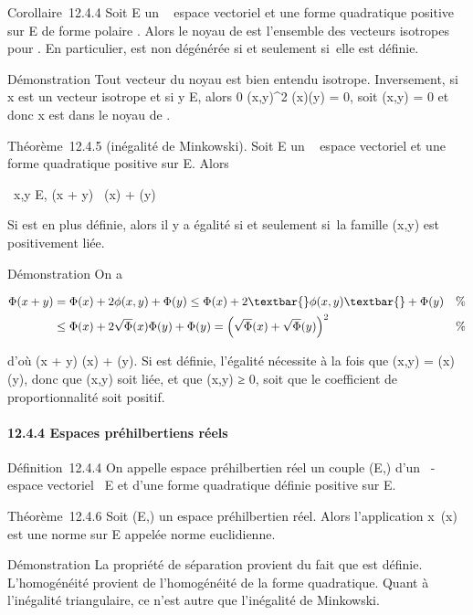 \documentclass[]{article}
\begin{document}
Corollaire~12.4.4 Soit E un ~ espace vectoriel et \Phi une forme
quadratique positive sur E de forme polaire \phi. Alors le noyau de \Phi est
l'ensemble des vecteurs isotropes pour \Phi. En particulier, \Phi est non
dégénérée si et seulement si~elle est définie.

Démonstration Tout vecteur du noyau est bien entendu isotrope.
Inversement, si x est un vecteur isotrope et si y \in E, alors 0 \leq
\phi(x,y)^2 \leq \Phi(x)\Phi(y) = 0, soit \phi(x,y) = 0 et donc x est dans
le noyau de \phi.

Théorème~12.4.5 (inégalité de Minkowski). Soit E un ~ espace vectoriel
et \Phi une forme quadratique positive sur E. Alors

\forall~x,y \in E, \sqrt\Phi(x + y)~
\leq\sqrt\Phi(x) + \sqrt\Phi(y)

Si \Phi est en plus définie, alors il y a égalité si et seulement si~la
famille (x,y) est positivement liée.

Démonstration On a

\begin{align*} \Phi(x + y)& = \Phi(x) + 2\phi(x,y) + \Phi(y) \leq
\Phi(x) + 2\textbar{}\phi(x,y)\textbar{} + \Phi(y)& \%&
\\ & \leq \Phi(x) +
2\sqrt\Phi(x)\Phi(y) + \Phi(y) = \left
(\sqrt\Phi(x) +
\sqrt\Phi(y)\right )^2& \%&
\\ \end{align*}

d'où \sqrt\Phi(x + y) \leq\sqrt\Phi(x) +
\sqrt\Phi(y). Si \Phi est définie, l'égalité nécessite à la
fois que \textbar{}\phi(x,y)\textbar{} = \sqrt\Phi(x)\Phi(y),
donc que (x,y) soit liée, et que \phi(x,y) ≥ 0, soit que le coefficient de
proportionnalité soit positif.

\paragraph{12.4.4 Espaces préhilbertiens réels}

Définition~12.4.4 On appelle espace préhilbertien réel un couple (E,\Phi)
d'un ~-espace vectoriel ~E et d'une forme quadratique définie positive
sur E.

Théorème~12.4.6 Soit (E,\Phi) un espace préhilbertien réel. Alors
l'application x\mapsto~\sqrt\Phi(x)
est une norme sur E appelée norme euclidienne.

Démonstration La propriété de séparation provient du fait que \Phi est
définie. L'homogénéité provient de l'homogénéité de la forme
quadratique. Quant à l'inégalité triangulaire, ce n'est autre que
l'inégalité de Minkowski.
\end{document}
